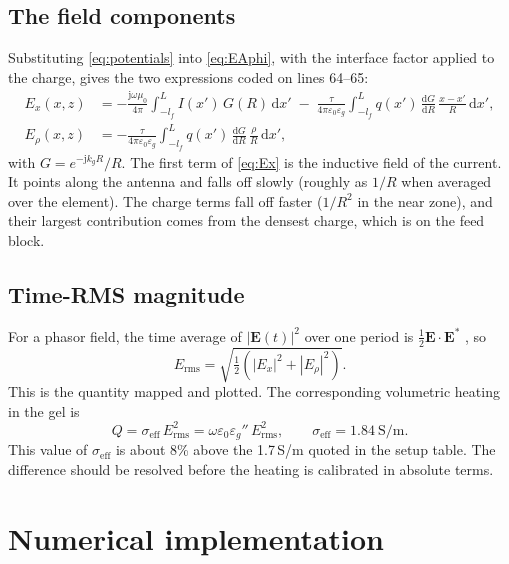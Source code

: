 \documentclass[11pt,a4paper]{article}
\newcommand{\eps}{\varepsilon}
\newcommand{\dd}{\mathrm{d}}
\newcommand{\jj}{\mathrm{j}}
\newcommand{\Erms}{E_{\mathrm{rms}}}
\begin{document}
\subsection{The field components}

Substituting \eqref{eq:potentials} into \eqref{eq:EAphi}, with the interface factor applied to the charge,
gives the two expressions coded on lines 64--65:
\begin{align}
  E_x(x,z) &= -\frac{\jj\omega\mu_0}{4\pi}\int_{-l_f}^{L} I(x')\,G(R)\,\dd x'
             \;-\;\frac{\tau}{4\pi\eps_0\eps_g}\int_{-l_f}^{L} q(x')\,\frac{\dd G}{\dd R}\,\frac{x-x'}{R}\,\dd x',
  \label{eq:Ex}\\[4pt]
  E_\rho(x,z) &= -\frac{\tau}{4\pi\eps_0\eps_g}\int_{-l_f}^{L} q(x')\,\frac{\dd G}{\dd R}\,\frac{\rho}{R}\,\dd x',
  \label{eq:Erho}
\end{align}
with $G = e^{-\jj k_g R}/R$. The first term of \eqref{eq:Ex} is the inductive field of the current. It
points along the antenna and falls off slowly (roughly as $1/R$ when averaged over the element). The charge
terms fall off faster ($1/R^2$ in the near zone), and their largest contribution comes from the densest
charge, which is on the feed block.

\subsection{Time-RMS magnitude}

For a phasor field, the time average of $|\mathbf E(t)|^2$ over one period is
$\tfrac12\mathbf E\cdot\mathbf E^*$ \cite{Harrington1961}, so
\begin{equation}
  \Erms = \sqrt{\tfrac12\left(|E_x|^2 + |E_\rho|^2\right)} .
  \label{eq:Erms}
\end{equation}
This is the quantity mapped and plotted. The corresponding volumetric heating in the gel is
\begin{equation}
  Q = \sigma_{\text{eff}}\,\Erms^2 = \omega\eps_0\eps_g''\,\Erms^2 ,
  \qquad \sigma_{\text{eff}} = 1.84\ \text{S/m}.
\end{equation}
This value of $\sigma_{\text{eff}}$ is about 8\% above the 1.7\,S/m quoted in the setup table. The difference
should be resolved before the heating is calibrated in absolute terms.

\section{Numerical implementation}
\end{document}
